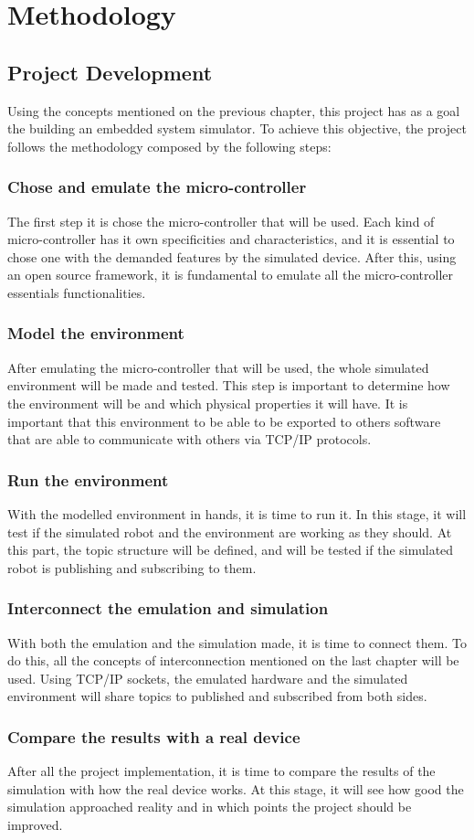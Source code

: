 \documentclass[../monografia.tex]{subfiles}
\begin{document}
\part{Methodology}

\chapter{Project Development}

Using the concepts mentioned on the previous chapter, this project has as a goal the building an embedded system simulator.
To achieve this objective, the project follows the methodology composed by the following steps:

\section{Chose and emulate the micro-controller}
The first step it is chose the micro-controller that will be used. Each kind of micro-controller has it own specificities and characteristics, and it is essential to chose one with the demanded features by the simulated device. After this, using an open source framework, it is fundamental to emulate all the micro-controller essentials functionalities.

\section{Model the environment}
After emulating the micro-controller that will be used, the whole simulated environment will be made and tested. This step is important to determine how the environment will be and which physical properties it will have. It is important that this environment to be able to be exported to others software that are able to communicate with others via TCP/IP protocols.

\section{Run the environment}
With the modelled environment in hands, it is time to run it. In this stage, it will test if the simulated robot and the environment are working as they should. At this part, the topic structure will be defined, and will be tested if the simulated robot is publishing and subscribing to them.

\section{Interconnect the emulation and simulation}
With both the emulation and the simulation made, it is time to connect them. To do this, all the concepts of interconnection mentioned on the last chapter will be used. Using TCP/IP sockets, the emulated hardware and the simulated environment will share topics to published and subscribed from both sides. 

\section{Compare the results with a real device}
After all the project implementation, it is time to compare the results of the simulation with how the real device works. At this stage, it will see how good  the simulation approached reality and in which points the project should be improved.
\end{document}
